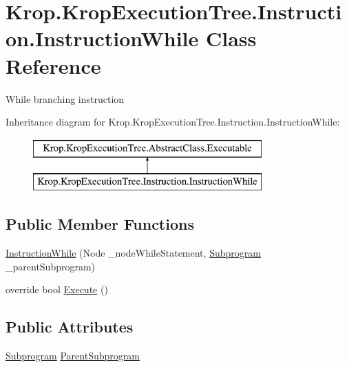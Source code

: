 \hypertarget{class_krop_1_1_krop_execution_tree_1_1_instruction_1_1_instruction_while}{}\section{Krop.\+Krop\+Execution\+Tree.\+Instruction.\+Instruction\+While Class Reference}
\label{class_krop_1_1_krop_execution_tree_1_1_instruction_1_1_instruction_while}


While branching instruction  


Inheritance diagram for Krop.\+Krop\+Execution\+Tree.\+Instruction.\+Instruction\+While\+:\begin{figure}[H]
\begin{center}
\leavevmode
\includegraphics[height=2.000000cm]{class_krop_1_1_krop_execution_tree_1_1_instruction_1_1_instruction_while}
\end{center}
\end{figure}
\subsection*{Public Member Functions}
\begin{DoxyCompactItemize}
\item 
\mbox{\hyperlink{class_krop_1_1_krop_execution_tree_1_1_instruction_1_1_instruction_while_a5329f172e06824a1d611f92281c7b366}{Instruction\+While}} (Node \+\_\+node\+While\+Statement, \mbox{\hyperlink{class_krop_1_1_krop_execution_tree_1_1_subprogram}{Subprogram}} \+\_\+parent\+Subprogram)
\item 
override bool \mbox{\hyperlink{class_krop_1_1_krop_execution_tree_1_1_instruction_1_1_instruction_while_a98200d1758042e65604af4ad3cf95c9c}{Execute}} ()
\end{DoxyCompactItemize}
\subsection*{Public Attributes}
\begin{DoxyCompactItemize}
\item 
\mbox{\hyperlink{class_krop_1_1_krop_execution_tree_1_1_subprogram}{Subprogram}} \mbox{\hyperlink{class_krop_1_1_krop_execution_tree_1_1_instruction_1_1_instruction_while_ade7724a61c86599bdc632bfccc2363f4}{Parent\+Subprogram}}
\end{DoxyCompactItemize}


